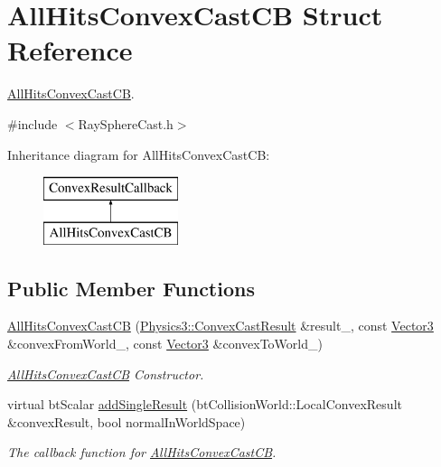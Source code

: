 \hypertarget{struct_all_hits_convex_cast_c_b}{}\section{All\+Hits\+Convex\+Cast\+CB Struct Reference}
\label{struct_all_hits_convex_cast_c_b}


\hyperlink{struct_all_hits_convex_cast_c_b}{All\+Hits\+Convex\+Cast\+CB}.  




{\ttfamily \#include $<$Ray\+Sphere\+Cast.\+h$>$}

Inheritance diagram for All\+Hits\+Convex\+Cast\+CB\+:\begin{figure}[H]
\begin{center}
\leavevmode
\includegraphics[height=2.000000cm]{struct_all_hits_convex_cast_c_b}
\end{center}
\end{figure}
\subsection*{Public Member Functions}
\begin{DoxyCompactItemize}
\item 
\hyperlink{struct_all_hits_convex_cast_c_b_a3dbf1b28b0d0ffc0441d8ca755a889ff}{All\+Hits\+Convex\+Cast\+CB} (\hyperlink{class_magnum_1_1_physics3_1_1_convex_cast_result}{Physics3\+::\+Convex\+Cast\+Result} \&result\+\_\+, const \hyperlink{class_magnum_1_1_vector3}{Vector3} \&convex\+From\+World\+\_\+, const \hyperlink{class_magnum_1_1_vector3}{Vector3} \&convex\+To\+World\+\_\+)
\begin{DoxyCompactList}\small\item\em \hyperlink{struct_all_hits_convex_cast_c_b}{All\+Hits\+Convex\+Cast\+CB} Constructor. \end{DoxyCompactList}\item 
virtual bt\+Scalar \hyperlink{struct_all_hits_convex_cast_c_b_ac87572b7cb531e1c1cc63cde8783a83e}{add\+Single\+Result} (bt\+Collision\+World\+::\+Local\+Convex\+Result \&convex\+Result, bool normal\+In\+World\+Space)
\begin{DoxyCompactList}\small\item\em The callback function for \hyperlink{struct_all_hits_convex_cast_c_b}{All\+Hits\+Convex\+Cast\+CB}. \end{DoxyCompactList}\end{DoxyCompactItemize}

